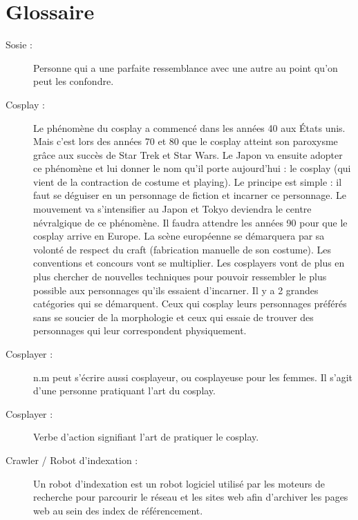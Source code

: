 \documentclass[a4paper,12pt]{article}
\begin{document}
\newpage



\newpage
\section*{Glossaire}
\begin{description}
\item [Sosie :] Personne qui a une parfaite ressemblance avec une autre au point qu'on peut les confondre.
\item [Cosplay :] Le phénomène du cosplay a commencé dans les années 40 aux États unis. Mais c'est lors des années 70 et 80 que le cosplay atteint son paroxysme grâce aux succès de Star Trek et Star Wars. Le Japon va ensuite adopter ce phénomène et lui donner le nom qu'il porte aujourd'hui : le cosplay (qui vient de la contraction de costume et playing). Le principe est simple : il faut se déguiser en un personnage de fiction et incarner ce personnage. Le mouvement va s'intensifier au Japon et Tokyo deviendra le centre névralgique de ce phénomène. Il faudra attendre les années 90 pour que le cosplay arrive en Europe. La scène européenne se démarquera par sa volonté de respect du craft (fabrication manuelle de son costume). Les conventions et concours vont se multiplier. Les cosplayers vont de plus en plus chercher de nouvelles techniques pour pouvoir ressembler le plus possible aux personnages qu'ils essaient d'incarner. Il y a 2 grandes catégories qui se démarquent. Ceux qui cosplay leurs personnages préférés sans se soucier de la morphologie et ceux qui essaie de trouver des personnages qui leur correspondent physiquement.
\item [Cosplayer :] n.m peut s'écrire aussi cosplayeur, ou cosplayeuse pour les femmes. Il s'agit d'une personne pratiquant l'art du cosplay. 
\item [Cosplayer :] Verbe d'action signifiant l'art de pratiquer le cosplay. 
\item [Crawler / Robot d'indexation :] Un robot d’indexation est un robot logiciel utilisé par les moteurs de recherche pour parcourir le réseau et les sites web afin d’archiver les pages web au sein des index de référencement.

\end{description}
\end{document}
